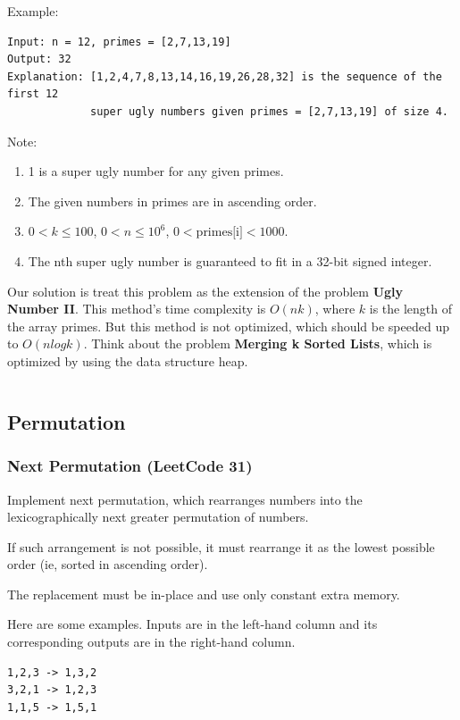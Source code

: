 \documentclass[11pt]{article}
\begin{document}
Example:
\begin{verbatim}
Input: n = 12, primes = [2,7,13,19]
Output: 32 
Explanation: [1,2,4,7,8,13,14,16,19,26,28,32] is the sequence of the first 12 
             super ugly numbers given primes = [2,7,13,19] of size 4.
\end{verbatim}
Note:
\begin{enumerate}
	\item 1 is a super ugly number for any given primes.
	\item The given numbers in primes are in ascending order.
	\item $0 < k \leq 100$, $0 < n \leq 10^6$, $0 < \text{primes[i]} < 1000$.
	\item The nth super ugly number is guaranteed to fit in a 32-bit signed integer.
\end{enumerate}

Our solution is treat this problem as the extension of the problem \textbf{Ugly Number II}. 
This method's time complexity is $O(nk)$, where $k$ is the length of the array primes. 
But this method is not optimized, which should be speeded up to $O(n log k)$. 
Think about the problem \textbf{Merging k Sorted Lists}, which is optimized by using the data structure heap. 

\inputminted[breaklines=true,frame=leftline, linenos=true]{python}{src/nthSuperUglyNumber.py}

\subsection{Permutation}
\subsubsection{Next Permutation (LeetCode 31)}
Implement next permutation, which rearranges numbers into the lexicographically next greater permutation of numbers.

If such arrangement is not possible, it must rearrange it as the lowest possible order (ie, sorted in ascending order).

The replacement must be in-place and use only constant extra memory.

Here are some examples. Inputs are in the left-hand column and its corresponding outputs are in the right-hand column.
\begin{verbatim}
1,2,3 -> 1,3,2
3,2,1 -> 1,2,3
1,1,5 -> 1,5,1	
\end{verbatim}
\end{document}
